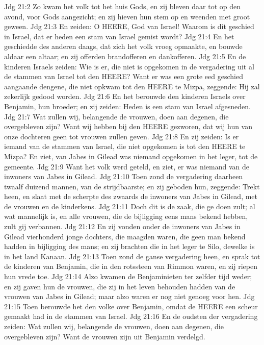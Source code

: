Jdg 21:2  Zo kwam het volk tot het huis Gods, en zij bleven daar tot op den avond, voor Gods aangezicht; en zij hieven hun stem op en weenden met groot geween.
Jdg 21:3  En zeiden: O HEERE, God van Israel! Waarom is dit geschied in Israel, dat er heden een stam van Israel gemist wordt?
Jdg 21:4  En het geschiedde des anderen daags, dat zich het volk vroeg opmaakte, en bouwde aldaar een altaar; en zij offerden brandofferen en dankofferen.
Jdg 21:5  En de kinderen Israels zeiden: Wie is er, die niet is opgekomen in de vergadering uit al de stammen van Israel tot den HEERE? Want er was een grote eed geschied aangaande dengene, die niet opkwam tot den HEERE te Mizpa, zeggende: Hij zal zekerlijk gedood worden.
Jdg 21:6  En het berouwde den kinderen Israels over Benjamin, hun broeder; en zij zeiden: Heden is een stam van Israel afgesneden.
Jdg 21:7  Wat zullen wij, belangende de vrouwen, doen aan degenen, die overgebleven zijn? Want wij hebben bij den HEERE gezworen, dat wij hun van onze dochteren geen tot vrouwen zullen geven.
Jdg 21:8  En zij zeiden: Is er iemand van de stammen van Israel, die niet opgekomen is tot den HEERE te Mizpa? En ziet, van Jabes in Gilead was niemand opgekomen in het leger, tot de gemeente.
Jdg 21:9  Want het volk werd geteld, en ziet, er was niemand van de inwoners van Jabes in Gilead.
Jdg 21:10  Toen zond de vergadering daarheen twaalf duizend mannen, van de strijdbaarste; en zij geboden hun, zeggende: Trekt heen, en slaat met de scherpte des zwaards de inwoners van Jabes in Gilead, met de vrouwen en de kinderkens.
Jdg 21:11  Doch dit is de zaak, die ge doen zult; al wat mannelijk is, en alle vrouwen, die de bijligging eens mans bekend hebben, zult gij verbannen.
Jdg 21:12  En zij vonden onder de inwoners van Jabes in Gilead vierhonderd jonge dochters, die maagden waren, die geen man bekend hadden in bijligging des mans; en zij brachten die in het leger te Silo, dewelke is in het land Kanaan.
Jdg 21:13  Toen zond de ganse vergadering heen, en sprak tot de kinderen van Benjamin, die in den rotssteen van Rimmon waren, en zij riepen hun vrede toe.
Jdg 21:14  Alzo kwamen de Benjaminieten ter zelfder tijd weder; en zij gaven hun de vrouwen, die zij in het leven behouden hadden van de vrouwen van Jabes in Gilead; maar alzo waren er nog niet genoeg voor hen.
Jdg 21:15  Toen berouwde het den volke over Benjamin, omdat de HEERE een scheur gemaakt had in de stammen van Israel.
Jdg 21:16  En de oudsten der vergadering zeiden: Wat zullen wij, belangende de vrouwen, doen aan degenen, die overgebleven zijn? Want de vrouwen zijn uit Benjamin verdelgd.
